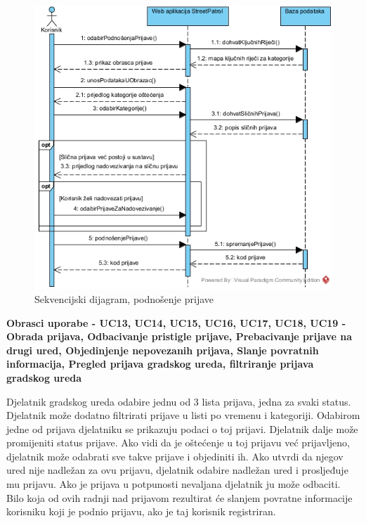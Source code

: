 				\begin{figure}[H]
					\includegraphics[width=\textwidth]{slike/Podnosenje_prijaveSD.jpg} %
					\caption{Sekvencijski dijagram, podnošenje prijave}
					\label{fig:sekvencijskiDijagram2} %
				\end{figure}
				\eject
				
				\textbf{Obrasci uporabe - UC13, UC14, UC15, UC16, UC17, UC18, UC19 - Obrada prijava, Odbacivanje pristigle prijave, Prebacivanje prijave na drugi ured, Objedinjenje nepovezanih prijava, Slanje povratnih informacija, Pregled prijava gradskog ureda, filtriranje prijava gradskog ureda}
				
				Djelatnik gradskog ureda odabire jednu od 3 lista prijava, jedna za svaki status. Djelatnik može dodatno filtrirati prijave u listi po vremenu i kategoriji. Odabirom jedne od prijava djelatniku se prikazuju podaci o toj prijavi. Djelatnik dalje može promijeniti status prijave. Ako vidi da je oštećenje u toj prijavu već prijavljeno, djelatnik može odabrati sve takve prijave i objediniti ih. Ako utvrdi da njegov ured nije nadležan za ovu prijavu, djelatnik odabire nadležan ured i prosljeđuje mu prijavu. Ako je prijava u potpunosti nevaljana djelatnik ju može odbaciti. Bilo koja od ovih radnji nad prijavom rezultirat će slanjem povratne informacije korisniku koji je podnio prijavu, ako je taj korisnik registriran.
				
